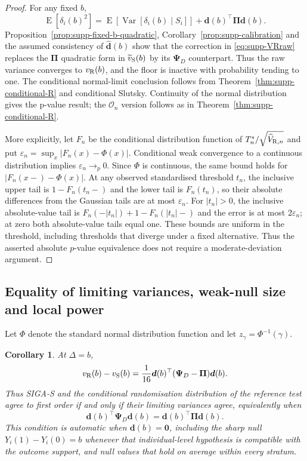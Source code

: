 \documentclass[12pt,a4paper]{article}
\newtheorem{corollary}{Corollary}
\theoremstyle{definition}
\theoremstyle{remark}\newtheorem{remark}{Remark}
\numberwithin{equation}{section}
\newcommand{\E}{\operatorname{E}}
\newcommand{\Var}{\operatorname{Var}}
\begin{document}
\begin{proof}
For any fixed $b$,
\[
\E[\delta_i(b)^2]
=\E[\Var[\delta_i(b)\mid S_i]]
+\bm d(b)^\top\bm\Pi\bm d(b).
\]
Proposition~\ref{prop:supp-fixed-b-quadratic}, Corollary~\ref{prop:supp-calibration} and the assumed consistency of $\widehat{\bm d}(b)$ show that the correction in \eqref{eq:supp-VRraw} replaces the $\bm\Pi$ quadratic form in $\widetilde v_{\rm S}(b)$ by its $\bm\Psi_D$ counterpart. Thus the raw variance converges to $v_{\rm R}(b)$, and the floor is inactive with probability tending to one. The conditional normal-limit conclusion follows from Theorem~\ref{thm:supp-conditional-R} and conditional Slutsky. Continuity of the normal distribution gives the p-value result; the $\mathcal O_n$ version follows as in Theorem~\ref{thm:supp-conditional-R}.


More explicitly, let $F_n$ be the conditional distribution function of $T_n^*/\sqrt{\widehat V_{{\rm R},n}}$ and put $\varepsilon_n=\sup_x|F_n(x)-\Phi(x)|$. Conditional weak convergence to a continuous distribution implies $\varepsilon_n\to_p0$. Since $\Phi$ is continuous, the same bound holds for $|F_n(x-)-\Phi(x)|$. At any observed standardised threshold $t_n$, the inclusive upper tail is $1-F_n(t_n-)$ and the lower tail is $F_n(t_n)$, so their absolute differences from the Gaussian tails are at most $\varepsilon_n$. For $|t_n|>0$, the inclusive absolute-value tail is $F_n(-|t_n|)+1-F_n(|t_n|-)$ and the error is at most $2\varepsilon_n$; at zero both absolute-value tails equal one. These bounds are uniform in the threshold, including thresholds that diverge under a fixed alternative. Thus the asserted absolute $p$-value equivalence does not require a moderate-deviation argument.
\end{proof}

\subsection{Equality of limiting variances, weak-null size and local power}
Let $\Phi$ denote the standard normal distribution function and let $z_\gamma=\Phi^{-1}(\gamma)$.

\begin{corollary}\label{cor:supp-variance-equality}
At $\Delta=b$,
\begin{equation}\label{eq:supp-gap}
v_{\rm R}(b)-v_{\rm S}(b)
=\frac1{16}\bm d(b)^\top
(\bm\Psi_D-\bm\Pi)\bm d(b).
\end{equation}
Thus SIGA-S and the conditional randomisation distribution of the reference test agree to first order if and only if their limiting variances agree, equivalently when
\[
\bm d(b)^\top\bm\Psi_D\bm d(b)
=\bm d(b)^\top\bm\Pi\bm d(b).
\]
This condition is automatic when $\bm d(b)=\bm0$, including the sharp null $Y_i(1)-Y_i(0)=b$ whenever that individual-level hypothesis is compatible with the outcome support, and null values that hold on average within every stratum.
\end{corollary}
\end{document}

